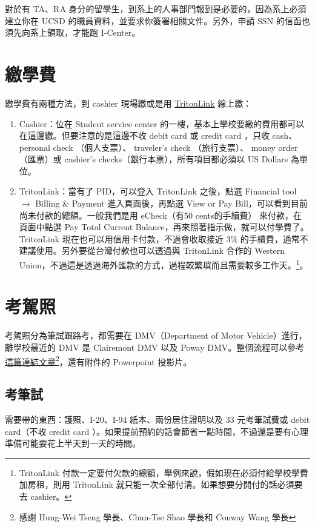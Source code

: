 \documentclass[10pt,a4paper]{book}
\begin{document}
\begin{CJK}{UTF8}{bkai}
對於有 TA、RA 身分的留學生，到系上的人事部門報到是必要的，因為系上必須建立你在 UCSD 的職員資料，並要求你簽署相關文件。另外，申請 SSN 的信函也須先向系上領取，才能跑 I-Center。

\section{繳學費}\label{sec:tuition}
繳學費有兩種方法，到 cashier 現場繳或是用 \href{https://act.ucsd.edu/myTritonlink20/display.htm}{TritonLink} 線上繳：
\begin{enumerate}
\item Cashier：位在 Student service center 的一樓，基本上學校要繳的費用都可以在這邊繳。但要注意的是這邊不收 debit card 或 credit card ，只收 cash、personal check （個人支票）、 traveler's check （旅行支票）、 money order （匯票）或 cashier's checks（銀行本票），所有項目都必須以 US Dollars 為單位。
\item TritonLink：當有了 PID，可以登入 TritonLink 之後，點選 Financial tool $\rightarrow$ Billing \& Payment 進入頁面後，再點選 View or Pay Bill，可以看到目前尚未付款的總額。一般我們是用 eCheck（有50 cents的手續費） 來付款，在頁面中點選 Pay Total Current Balance，再來照著指示做，就可以付學費了。TritonLink 現在也可以用信用卡付款，不過會收取接近 3\% 的手續費，通常不建議使用。另外要從台灣付款也可以透過與 TritonLink 合作的 Western Union，不過這是透過海外匯款的方式，過程較繁瑣而且需要較多工作天。\footnote{TritonLink 付款一定要付欠款的總額，舉例來說，假如現在必須付給學校學費加房租，則用 TritonLink 就只能一次全部付清。如果想要分開付的話必須要去 cashier。}。
\end{enumerate}

\section{考駕照}
考駕照分為筆試跟路考，都需要在 DMV（Department of Motor Vehicle）進行，離學校最近的 DMV 是 Clairemont DMV 以及 Poway DMV。整個流程可以參考\href{https://www.facebook.com/groups/13591139149/10151810813429150/}{這篇連結文章}\footnote{感謝 Hung-Wei Tseng 學長、Chun-Tse Shao 學長和 Conway Wang 學長}，還有附件的 Powerpoint 投影片。

\subsection{考筆試}
需要帶的東西：護照、I-20、I-94 紙本、兩份居住證明以及 33 元考筆試費或 debit card（不收 credit card ）。如果提前預約的話會節省一點時間，不過還是要有心理準備可能要花上半天到一天的時間。


\end{CJK}
\end{document}
